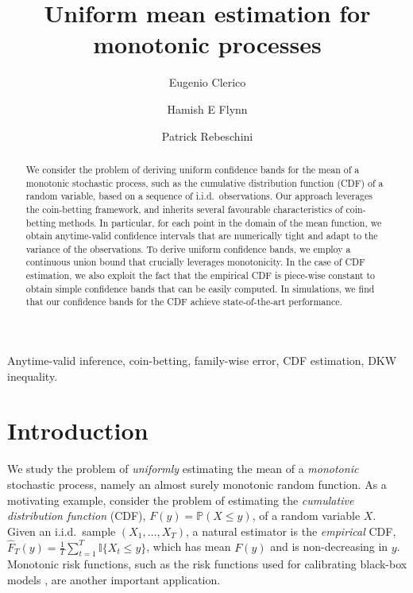 \documentclass[3p, authoryear, 10pt]{elsarticle}%
\begin{document}
 

\begin{frontmatter}
    \title{Uniform mean estimation for monotonic processes} %


 


    \author[1]{Eugenio Clerico}

    \author[1]{Hamish E Flynn}

    \author[2]{Patrick Rebeschini}
    

    
    
    \begin{abstract} 
        We consider the problem of deriving uniform confidence bands for the mean of a monotonic stochastic process, such as the cumulative distribution function (CDF) of a random variable, based on a sequence of i.i.d.\ observations. Our approach leverages the coin-betting framework, and inherits several favourable characteristics of coin-betting methods. In particular, for each point in the domain of the mean function, we obtain anytime-valid confidence intervals that are numerically tight and adapt to the variance of the observations. To derive uniform confidence bands, we employ a continuous union bound that crucially leverages monotonicity. In the case of CDF estimation, we also exploit the fact that the empirical CDF is piece-wise constant to obtain simple confidence bands that can be easily computed. In simulations, we find that our confidence bands for the CDF achieve state-of-the-art performance.
    \end{abstract}
    \begin{keyword}
        Anytime-valid inference, coin-betting, family-wise error, CDF estimation, DKW inequality.
    \end{keyword}
\end{frontmatter}

\section{Introduction}

We study the problem of \emph{uniformly} estimating the mean of a \emph{monotonic} stochastic process, namely an almost surely monotonic random function. As a motivating example, consider the problem of estimating the \emph{cumulative distribution function} (CDF), $F(y) = \mathbb{P}(X \leq y)$, of a random variable $X$. Given an i.i.d.~sample $(X_1, \dots, X_T)$, a natural estimator is the \emph{empirical} CDF, $\hat{F}_T(y) = \frac{1}{T}\sum_{t=1}^{T}\mathbb{I}\{X_t \leq y\}$, which has mean $F(y)$ and is non-decreasing in $y$. Monotonic risk functions, such as the risk functions used for calibrating black-box models \citep{bates2021distribution, nguyen2024data}, are another important application.
\end{document}
